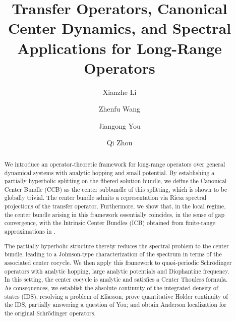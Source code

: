\documentclass[reqno,11pt]{amsart}
\begin{document}
	
	
	\title[]{Transfer Operators, Canonical Center Dynamics, and Spectral Applications for Long-Range Operators} 


\author{Xianzhe Li}
\address{Department of Mathematics, University of California, Berkeley, CA 94720, USA} 

\author{Zhenfu Wang}
\address{
	Chern Institute of Mathematics and LPMC, Nankai University, Tianjin 300071, China
}


 \author{Jiangong You}
 \address{
 Chern Institute of Mathematics and LPMC, Nankai University, Tianjin 300071, China} 


\author{Qi Zhou}
\address{
	Chern Institute of Mathematics and LPMC, Nankai University, Tianjin 300071, China
}


	
	


\begin{abstract}

We introduce an operator-theoretic framework for long-range operators over general dynamical systems with analytic hopping and small potential. By establishing a partially hyperbolic splitting on the fibered solution bundle, we define the Canonical Center Bundle (CCB) as the center subbundle of this splitting, which is shown to be globally trivial. The center bundle admits a representation via Riesz spectral projections of the transfer operator.
Furthermore, we show that, in the local regime, the center bundle arising in this framework essentially coincides, in the sense of gap convergence, with the Intrinsic Center Bundles (ICB) obtained from finite-range approximations in \cite{GJ}.


The partially hyperbolic structure thereby reduces the spectral problem to the center bundle, leading to a Johnson-type characterization of the spectrum in terms of the associated center cocycle. We then apply this framework to  quasi-periodic Schr\"odinger operators with analytic hopping, large analytic potentials and Diophantine frequency. In this setting, the center cocycle is analytic and satisfies a Center Thouless formula. As consequences, we establish the absolute continuity of the integrated density of states (IDS), resolving a problem of Eliasson; prove quantitative H\"older continuity of the IDS, partially answering a question of You; and obtain Anderson localization for the original Schr\"odinger operators.
\end{abstract}
\end{document}
